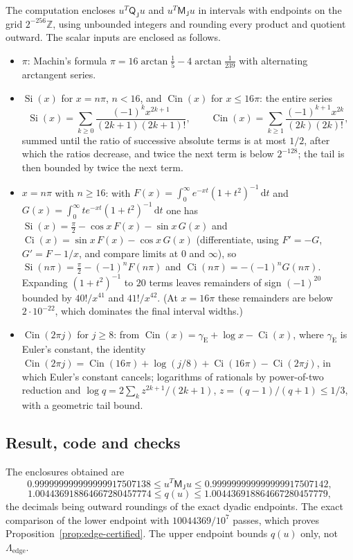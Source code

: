 \documentclass{siamart251216}
\newcommand{\dd}{\,\mathrm d}
\begin{document}
The computation encloses $u^T\mathsf Q_{\mathsf J}u$ and $u^T\mathsf M_{\mathsf J}u$ in intervals with endpoints on the
grid $2^{-256}\mathbb Z$, using unbounded integers and rounding every product
and quotient outward. The scalar inputs are enclosed as follows.
\begin{itemize}
\item $\pi$: Machin's formula $\pi=16\arctan\frac15-4\arctan\frac1{239}$ with
alternating arctangent series.
\item $\operatorname{Si}(x)$ for $x=n\pi$, $n<16$, and $\operatorname{Cin}(x)$
for $x\le16\pi$: the entire series
\[
 \operatorname{Si}(x)=\sum_{k\ge0}\frac{(-1)^kx^{2k+1}}{(2k+1)(2k+1)!},\qquad
 \operatorname{Cin}(x)=\sum_{k\ge1}\frac{(-1)^{k+1}x^{2k}}{(2k)(2k)!},
\]
summed until the ratio of successive absolute terms is at most $1/2$, after
which the ratios decrease, and twice the next term is below $2^{-128}$; the
tail is then bounded by twice the next term.
\item $x=n\pi$ with $n\ge16$: with
$F(x)=\int_0^\infty e^{-xt}(1+t^2)^{-1}\dd t$ and
$G(x)=\int_0^\infty te^{-xt}(1+t^2)^{-1}\dd t$ one has
$\operatorname{Si}(x)=\frac\pi2-\cos x\,F(x)-\sin x\,G(x)$ and
$\operatorname{Ci}(x)=\sin x\,F(x)-\cos x\,G(x)$ (differentiate, using
$F'=-G$, $G'=F-1/x$, and compare limits at $0$ and $\infty$), so
$\operatorname{Si}(n\pi)=\frac\pi2-(-1)^nF(n\pi)$ and
$\operatorname{Ci}(n\pi)=-(-1)^nG(n\pi)$. Expanding $(1+t^2)^{-1}$ to
$20$ terms leaves remainders of sign $(-1)^{20}$ bounded by $40!/x^{41}$ and
$41!/x^{42}$. (At $x=16\pi$ these remainders are below $2\cdot10^{-22}$,
which dominates the final interval widths.)
\item $\operatorname{Cin}(2\pi j)$ for $j\ge8$: from
$\operatorname{Cin}(x)=\gamma_{\mathrm E}+\log x-\operatorname{Ci}(x)$, where $\gamma_{\mathrm E}$ is Euler's constant, the identity
$\operatorname{Cin}(2\pi j)=\operatorname{Cin}(16\pi)+\log(j/8)+\operatorname{Ci}(16\pi)-\operatorname{Ci}(2\pi j)$,
in which Euler's constant cancels; logarithms of rationals by power-of-two
reduction and $\log q=2\sum_kz^{2k+1}/(2k+1)$, $z=(q-1)/(q+1)\le1/3$, with a
geometric tail bound.
\end{itemize}

\subsection{Result, code and checks}

The enclosures obtained are
\[
 0.999999999999999917507138\le u^T\mathsf M_{\mathsf J}u\le0.999999999999999917507142,
\]
\[
 1.004436918864667280457774\le q(u)\le1.004436918864667280457779,
\]
the decimals being outward roundings of the exact dyadic endpoints. The
exact comparison of the lower endpoint with $10044369/10^7$ passes, which
proves Proposition~\ref{prop:edge-certified}. The upper endpoint bounds
$q(u)$ only, not $\Lambda_{\mathrm{edge}}$.
\end{document}
